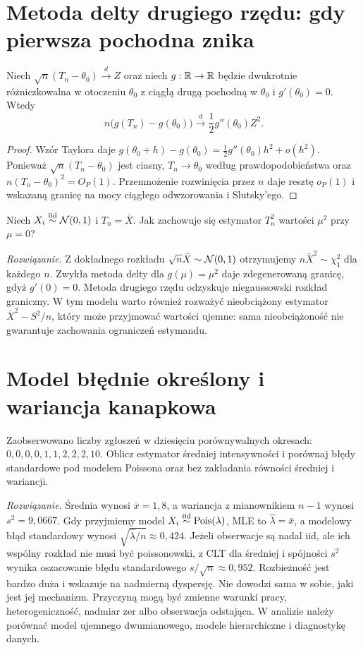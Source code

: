\section{Metoda delty drugiego rzędu: gdy pierwsza pochodna znika}
\begin{twierdzenie}
\label{thm:delta-second}
Niech $\sqrt n(T_n-\theta_0)\xrightarrow{d}Z$ oraz niech
$g:\mathbb R\to\mathbb R$ będzie dwukrotnie różniczkowalna w otoczeniu
$\theta_0$ z ciągłą drugą pochodną w $\theta_0$ i
$g'(\theta_0)=0$. Wtedy
\[
n\bigl(g(T_n)-g(\theta_0)\bigr)
\xrightarrow{d}\frac12g''(\theta_0)Z^2.
\]
\end{twierdzenie}
\begin{proof}
Wzór Taylora daje
$g(\theta_0+h)-g(\theta_0)=\frac12g''(\theta_0)h^2+
o(h^2)$. Ponieważ $\sqrt n(T_n-\theta_0)$ jest ciasny,
$T_n\to\theta_0$ według prawdopodobieństwa oraz
$n(T_n-\theta_0)^2=O_P(1)$. Przemnożenie rozwinięcia
przez $n$ daje resztę $o_P(1)$ i wskazaną granicę na mocy
ciągłego odwzorowania i Slutsky'ego.
\end{proof}
\begin{zadanie}
Niech $X_i\mathrel{\overset{\mathrm{iid}}\sim}\mathcal N(0,1)$ i $T_n=\bar X$. Jak zachowuje
się estymator $T_n^2$ wartości $\mu^2$ przy $\mu=0$?
\par\emph{Rozwiązanie.} Z dokładnego rozkładu
$\sqrt n\bar X\sim\mathcal N(0,1)$ otrzymujemy
$n\bar X^2\sim\chi_1^2$ dla każdego $n$.
Zwykła metoda delty dla $g(\mu)=\mu^2$ daje zdegenerowaną
granicę, gdyż $g'(0)=0$. Metoda drugiego rzędu odzyskuje
niegaussowski rozkład graniczny. W tym modelu warto również
rozważyć nieobciążony estymator $\bar X^2-S^2/n$,
który może przyjmować wartości ujemne: sama nieobciążoność
nie gwarantuje zachowania ograniczeń estymandu.
\end{zadanie}

\section{Model błędnie określony i wariancja kanapkowa}
\begin{zadanie}
Zaobserwowano liczby zgłoszeń w dziesięciu porównywalnych
okresach: $0,0,0,0,1,1,2,2,2,10$. Oblicz estymator średniej
intensywności i porównaj błędy standardowe pod modelem Poissona
oraz bez zakładania równości średniej i wariancji.
\par\emph{Rozwiązanie.} Średnia wynosi $\bar x=1{,}8$,
a wariancja z mianownikiem $n-1$ wynosi
$s^2=9{,}0667$. Gdy przyjmiemy model
$X_i\mathrel{\overset{\mathrm{iid}}\sim}\operatorname{Pois}(\lambda)$, MLE to $\widehat\lambda=\bar x$,
a modelowy błąd standardowy wynosi
$\sqrt{\widehat\lambda/n}\approx0{,}424$.
Jeżeli obserwacje są nadal iid, ale ich wspólny rozkład nie
musi być poissonowski, z CLT dla średniej i spójności
$s^2$ wynika oszacowanie błędu standardowego
$s/\sqrt n\approx0{,}952$.
Rozbieżność jest bardzo duża i wskazuje na nadmierną dyspersję.
Nie dowodzi sama w sobie, jaki jest jej mechanizm. Przyczyną
mogą być zmienne warunki pracy, heterogeniczność, nadmiar zer
albo obserwacja odstająca. W analizie należy porównać model
ujemnego dwumianowego, modele hierarchiczne i diagnostykę danych.
\end{zadanie}


